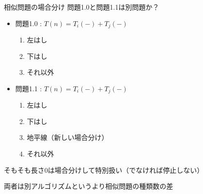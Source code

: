 \documentclass{beamer}
\begin{document}
\begin{frame}[fragile]{相似問題の場合分け}{}
問題1.0と問題1.1は別問題か？

\begin{itemize}%
\item 問題1.0 : $T(n)  = T_{i}(-) + T_{j}(-)$
\begin{enumerate}%
\item 左はし
\item 下はし
\item それ以外
\end{enumerate}
\item 問題1.1 : $T(n)  = T_{i}(-) + T_{j}(-)$
\begin{enumerate}%
\item 左はし
\item 下はし
\item 地平線（新しい場合分け）
\item それ以外
\end{enumerate}
\end{itemize}

\vfill
そもそも長さ0は場合分けして特別扱い（でなければ停止しない）

\vfill
両者は別アルゴリズムというより相似問題の種類数の差
\end{frame}
\end{document}
